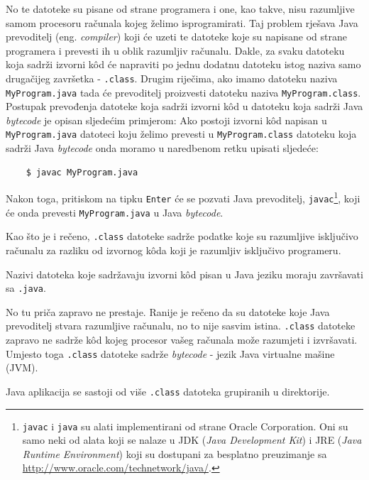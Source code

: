 No te datoteke su pisane od strane programera i one, kao takve, nisu razumljive samom procesoru računala kojeg želimo isprogramirati. Taj problem rješava Java prevoditelj (eng. \emph{compiler}) koji će uzeti te datoteke koje su napisane od strane programera i prevesti ih u oblik razumljiv računalu. Dakle, za svaku datoteku koja sadrži izvorni kôd će napraviti po jednu dodatnu datoteku istog naziva samo drugačijeg završetka - \texttt{.class}. Drugim riječima, ako imamo datoteku naziva \texttt{MyProgram.java} tada će prevoditelj proizvesti datoteku naziva \texttt{MyProgram.class}. Postupak prevođenja datoteke koja sadrži izvorni kôd u datoteku koja sadrži Java \emph{bytecode} je opisan sljedećim primjerom: Ako postoji izvorni kôd napisan u \texttt{MyProgram.java} datoteci koju želimo prevesti u \texttt{MyProgram.class} datoteku koja sadrži Java \emph{bytecode} onda moramo u naredbenom retku upisati sljedeće:

\begin{lstlisting}
    $ javac MyProgram.java
\end{lstlisting}

Nakon toga, pritiskom na tipku \texttt{Enter} će se pozvati Java prevoditelj, \texttt{javac}\footnote{\label{ftn:javaandjavac}\texttt{javac} i \texttt{java} su alati implementirani od strane Oracle Corporation. Oni su samo neki od alata koji se nalaze u JDK (\emph{Java Development Kit}) i JRE (\emph{Java Runtime Environment}) koji su dostupani za besplatno preuzimanje sa \url{http://www.oracle.com/technetwork/java/}.}, koji će onda prevesti \texttt{MyProgram.java} u Java \emph{bytecode}.

Kao što je i rečeno, \texttt{.class} datoteke sadrže podatke koje su razumljive isključivo računalu za razliku od izvornog kôda koji je razumljiv isključivo programeru.

\begin{infobox}
    Nazivi datoteka koje sadržavaju izvorni kôd pisan u Java jeziku moraju završavati sa \texttt{.java}.
\end{infobox}

No tu priča zapravo ne prestaje. Ranije je rečeno da su datoteke koje Java prevoditelj stvara razumljive računalu, no to nije sasvim istina. \texttt{.class} datoteke zapravo ne sadrže kôd kojeg procesor vašeg računala može razumjeti i izvršavati. Umjesto toga \texttt{.class} datoteke sadrže \emph{bytecode} - jezik Java virtualne mašine (JVM).

\begin{infobox}
    Java aplikacija se sastoji od više \texttt{.class} datoteka grupiranih u direktorije.
\end{infobox}

